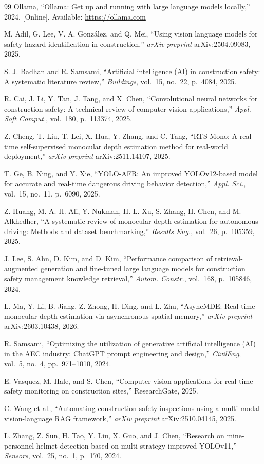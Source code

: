 \documentclass{article}
\begin{document}
\begin{thebibliography}{99}
Ollama, ``Ollama: Get up and running with large language models locally,'' 2024. [Online]. Available: \url{https://ollama.com}

M. Adil, G. Lee, V. A. Gonz\'{a}lez, and Q. Mei, ``Using vision language models for safety hazard identification in construction,'' \textit{arXiv preprint} arXiv:2504.09083, 2025.

S. J. Badhan and R. Samsami, ``Artificial intelligence (AI) in construction safety: A systematic literature review,'' \textit{Buildings}, vol.~15, no.~22, p.~4084, 2025.

R. Cai, J. Li, Y. Tan, J. Tang, and X. Chen, ``Convolutional neural networks for construction safety: A technical review of computer vision applications,'' \textit{Appl. Soft Comput.}, vol.~180, p.~113374, 2025.

Z. Cheng, T. Liu, T. Lei, X. Hua, Y. Zhang, and C. Tang, ``RTS-Mono: A real-time self-supervised monocular depth estimation method for real-world deployment,'' \textit{arXiv preprint} arXiv:2511.14107, 2025.

T. Ge, B. Ning, and Y. Xie, ``YOLO-AFR: An improved YOLOv12-based model for accurate and real-time dangerous driving behavior detection,'' \textit{Appl. Sci.}, vol.~15, no.~11, p.~6090, 2025.

Z. Huang, M. A. H. Ali, Y. Nukman, H. L. Xu, S. Zhang, H. Chen, and M. Alkhedher, ``A systematic review of monocular depth estimation for autonomous driving: Methods and dataset benchmarking,'' \textit{Results Eng.}, vol.~26, p.~105359, 2025.

J. Lee, S. Ahn, D. Kim, and D. Kim, ``Performance comparison of retrieval-augmented generation and fine-tuned large language models for construction safety management knowledge retrieval,'' \textit{Autom. Constr.}, vol.~168, p.~105846, 2024.

L. Ma, Y. Li, B. Jiang, Z. Zhong, H. Ding, and L. Zhu, ``AsyncMDE: Real-time monocular depth estimation via asynchronous spatial memory,'' \textit{arXiv preprint} arXiv:2603.10438, 2026.

R. Samsami, ``Optimizing the utilization of generative artificial intelligence (AI) in the AEC industry: ChatGPT prompt engineering and design,'' \textit{CivilEng}, vol.~5, no.~4, pp.~971--1010, 2024.

E. Vasquez, M. Hale, and S. Chen, ``Computer vision applications for real-time safety monitoring on construction sites,'' ResearchGate, 2025.

C. Wang et al., ``Automating construction safety inspections using a multi-modal vision-language RAG framework,'' \textit{arXiv preprint} arXiv:2510.04145, 2025.

L. Zhang, Z. Sun, H. Tao, Y. Liu, X. Guo, and J. Chen, ``Research on mine-personnel helmet detection based on multi-strategy-improved YOLOv11,'' \textit{Sensors}, vol.~25, no.~1, p.~170, 2024.

\end{thebibliography}
\end{document}
